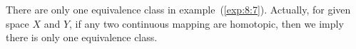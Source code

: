 \begin{remark}
There are only one equivalence class in example~(\ref{exp:8:7}). Actually, for given space $X$ and $Y$, if any two continuous mapping are homotopic, then we imply there is only one equivalence class.
\end{remark}
%
%
%
%
%
%


















